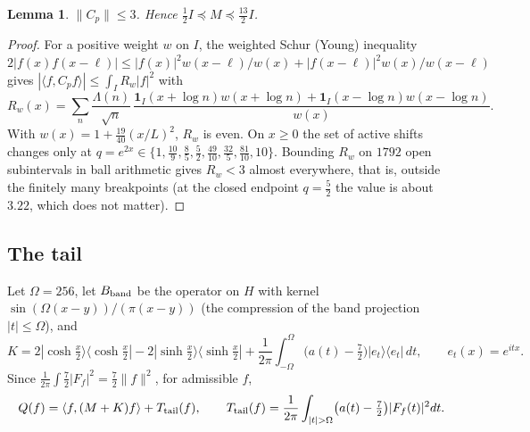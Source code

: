 \documentclass[11pt]{amsart}
\newtheorem{lemma}[proposition]{Lemma}
\theoremstyle{remark}
\numberwithin{equation}{section}
\begin{document}
\begin{lemma}\label{lem:Cp}
$\|C_p\|\le3$. Hence $\frac12I\preceq M\preceq\frac{13}2I$.
\end{lemma}
\begin{proof}
For a positive weight $w$ on $I$, the weighted Schur (Young) inequality $2|f(x)f(x-\ell)|\le|f(x)|^2w(x-\ell)/w(x)+|f(x-\ell)|^2w(x)/w(x-\ell)$ gives $|\langle f,C_pf\rangle|\le\int_IR_w|f|^2$ with
\[
R_w(x)=\sum_n\frac{\Lambda(n)}{\sqrt n}\,\frac{\mathbf 1_I(x+\log n)w(x+\log n)+\mathbf 1_I(x-\log n)w(x-\log n)}{w(x)} .
\]
With $w(x)=1+\frac{19}{40}(x/L)^2$, $R_w$ is even. On $x\ge0$ the set of active shifts changes only at $q=e^{2x}\in\{1,\frac{10}9,\frac85,\frac52,\frac{49}{10},\frac{32}5,\frac{81}{10},10\}$. Bounding $R_w$ on $1792$ open subintervals in ball arithmetic gives $R_w<3$ almost everywhere, that is, outside the finitely many breakpoints (at the closed endpoint $q=\frac52$ the value is about $3.22$, which does not matter).
\end{proof}

\subsection{The tail}
Let $\Omega=256$, let $B_{\rm band}$ be the operator on $H$ with kernel $\sin(\Omega(x-y))/(\pi(x-y))$ (the compression of the band projection $|t|\le\Omega$), and
\[
K=2|\cosh\tfrac x2\rangle\langle\cosh\tfrac x2|-2|\sinh\tfrac x2\rangle\langle\sinh\tfrac x2|+\frac1{2\pi}\int_{-\Omega}^{\Omega}\bigl(a(t)-\tfrac72\bigr)|e_t\rangle\langle e_t|\,dt,\qquad e_t(x)=e^{itx}.
\]
Since $\frac1{2\pi}\int\frac72|F_f|^2=\frac72\|f\|^2$, for admissible $f$,
\begin{equation}\label{eq:split}
Q(f)=\langle f,(M+K)f\rangle+T_{\rm tail}(f),\qquad T_{\rm tail}(f)=\frac1{2\pi}\int_{|t|>\Omega}\bigl(a(t)-\tfrac72\bigr)|F_f(t)|^2dt .
\end{equation}
\end{document}
